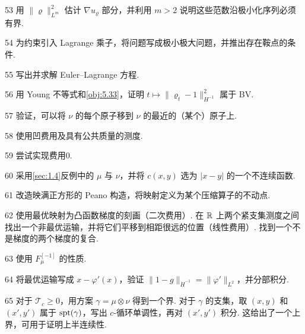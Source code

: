 \begin{sourcehint}{53}
用 $\|\varrho\|_{L^m}^2$ 估计 $\nabla u_\varrho$ 部分，并利用 $m>2$ 说明这些范数沿极小化序列必须有界.
\end{sourcehint}
\begin{sourcehint}{54}
为约束引入 Lagrange 乘子，将问题写成极小极大问题，并推出存在鞍点的条件.
\end{sourcehint}
\begin{sourcehint}{55}
写出并求解 Euler--Lagrange 方程.
\end{sourcehint}
\begin{sourcehint}{56}
用 Young 不等式和\autoref{obj:5.33}，证明 $t\mapsto\|\varrho_t-1\|_{H^{-1}}^2$ 属于 BV.
\end{sourcehint}
\begin{sourcehint}{57}
验证，可以将 $\nu$ 的每个原子移到 $\nu$ 的最近的（某个）原子上.
\end{sourcehint}
\begin{sourcehint}{58}
使用凹费用及具有公共质量的测度.
\end{sourcehint}
\begin{sourcehint}{59}
尝试实现费用0.
\end{sourcehint}
\begin{sourcehint}{60}
采用\autoref{sec:1.4}反例中的 $\mu$ 与 $\nu$，并将 $c(x,y)$ 选为 $|x-y|$ 的一个不连续函数.
\end{sourcehint}
\begin{sourcehint}{61}
改造映满正方形的 Peano 构造，将映射定义为某个压缩算子的不动点.
\end{sourcehint}
\begin{sourcehint}{62}
使用最优映射为凸函数梯度的刻画（二次费用）. 在 $\mathbb R$ 上两个紧支集测度之间找出一个非最优运输，并将它们平移到相距很远的位置（线性费用）. 找到一个不是梯度的两个梯度的复合.
\end{sourcehint}
\begin{sourcehint}{63}
使用 $F_\mu^{[-1]}$ 的性质.
\end{sourcehint}
\begin{sourcehint}{64}
将最优运输写成 $x-\varphi'(x)$，验证 $\|1-g\|_{\dot H^{-1}}=\|\varphi'\|_{L^2}$，并分部积分.
\end{sourcehint}
\begin{sourcehint}{65}
对于 $\mathscr T_c\geq0$，用方案 $\gamma=\mu\otimes\nu$ 得到一个界. 对于 $\gamma$ 的支集，取 $(x,y)$ 和 $(x',y')$ 属于 $\operatorname{spt}(\gamma)$，写出 $c$-循环单调性，再对 $(x',y')$ 积分. 这给出了一个上界，可用于证明上半连续性.
\end{sourcehint}
